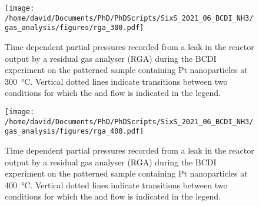 \begin{figure}[!htb]
    \centering
    \texttt{[image: /home/david/Documents/PhD/PhDScripts/SixS\_2021\_06\_BCDI\_NH3/gas\_analysis/figures/rga\_300.pdf]}
    \caption{
        Time dependent partial pressures recorded from a leak in the reactor output by a residual gas analyser (RGA) during the BCDI experiment on the patterned sample containing Pt nanoparticles at \qty{300}{\degreeCelsius}.
        Vertical dotted lines indicate transitions between two conditions for which the  and  flow is indicated in the legend.
    }
    \label{fig:RGA300BCDINanoparticles}
\end{figure}

\begin{figure}[!htb]
    \centering
    \texttt{[image: /home/david/Documents/PhD/PhDScripts/SixS\_2021\_06\_BCDI\_NH3/gas\_analysis/figures/rga\_400.pdf]}
    \caption{
        Time dependent partial pressures recorded from a leak in the reactor output by a residual gas analyser (RGA) during the BCDI experiment on the patterned sample containing Pt nanoparticles at \qty{400}{\degreeCelsius}.
        Vertical dotted lines indicate transitions between two conditions for which the  and  flow is indicated in the legend.
    }
    \label{fig:RGA400BCDINanoparticles}
\end{figure}
